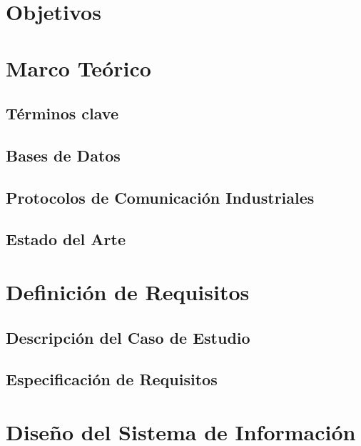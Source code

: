 \documentclass{thesis-tg-ie-pujc} %
\begin{document}
\chapter{Objetivos}


\chapter{Marco Teórico}
\section{Términos clave}


\newpage
\section{Bases de Datos}

\newpage
\section{Protocolos de Comunicación Industriales}

\newpage
\section{Estado del Arte}



\chapter{Definición de Requisitos}
\section{Descripción del Caso de Estudio}

\newpage
\section{Especificación de Requisitos}


\chapter{Diseño del Sistema de Información}

\end{document}
